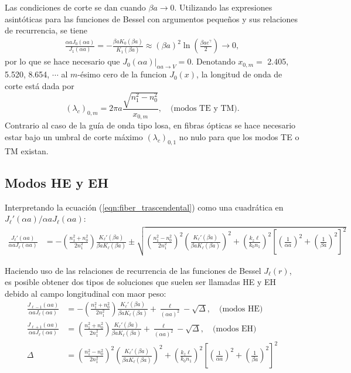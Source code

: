 Las condiciones de corte se dan cuando $\beta a \to 0$. Utilizando las expresiones asintóticas para las funciones de Bessel con argumentos pequeños y sus relaciones de recurrencia, se tiene
\begin{align*}
	\frac{\alpha a J_0(\alpha a)}{J_1(\alpha a)}  = -\frac{\beta a K_{0}(\beta a)} {K_1(\beta a)} \approx (\beta a)^2\ln\left(\frac{\beta a e^\gamma}{2}\right) \to 0,
\end{align*}
por lo que se hace necesario que $\left. J_0(\alpha a)\right|_{\alpha a \to V} = 0$. Denotando $x_{0,m}=$ 2.405,  5.520,  8.654, $\cdots$ al $m$-ésimo cero de la funcion $J_0(x)$, la longitud de onda de corte está dada por 
\begin{equation}
(\lambda_c)_{0,m} = 2\pi a \frac{\sqrt{n_1^2 - n_0^2}}{x_{0,m}}, \quad\text{(modos TE y TM).}
\end{equation} Contrario al caso de la guía de onda tipo losa, en fibras ópticas se hace necesario estar bajo un umbral de corte máximo $(\lambda_c)_{0,1}$ no nulo para que los modos TE o TM existan.


\subsection{Modos HE y EH}
Interpretando la ecuación (\ref{eqn:fiber_trascendental}) como una cuadrática en $J_\ell'(\alpha a)/\alpha a J_\ell(\alpha a)$:
\begin{align*}
	\frac{J_\ell'(\alpha a)}{\alpha a J_\ell(\alpha a)} &= -\left(\frac{n_1^2+n_0^2}{2n_1^2}\right) \frac{K_\ell'(\beta a)}{\beta a K_\ell(\beta a)}\pm\sqrt{\left(\frac{n_1^2-n_0^2}{2n_1^2}\right)^2\left(\frac{K_\ell'(\beta a)}{\beta a K_\ell(\beta a)}\right)^2+ \left( \frac{ k_z \ell}{ k_0 n_1} \right)^2\left[ \left(\frac{1}{\alpha a}\right)^2 + \left(\frac{1}{\beta a}\right)^2 \right]^2 }
\end{align*}

Haciendo uso de las relaciones de recurrencia de las funciones de Bessel $J_\ell(r)$,  es posible obtener dos tipos de soluciones que suelen ser llamadas HE y EH debido al campo longitudinal con maor peso:
\begin{align}
		\frac{J_{\ell-1}(\alpha a)}{\alpha a J_\ell(\alpha a)} &= -\left(\frac{n_1^2+n_0^2}{2n_1^2}\right) \frac{K_\ell'(\beta a)}{\beta a K_\ell(\beta a)}+\frac{\ell}{(\alpha a)^2}-\sqrt{\Delta}, \quad \text{(modos HE)}
		\label{eqn:HE}
	\\
		\frac{J_{\ell+1}(\alpha a)}{\alpha a J_\ell(\alpha a)} &= \left(\frac{n_1^2+n_0^2}{2n_1^2}\right) \frac{K_\ell'(\beta a)}{\beta a K_\ell(\beta a)}+\frac{\ell}{(\alpha a)^2}-\sqrt{\Delta}, \quad \text{(modos EH)}
		\label{eqn:EH}
		\\
		\Delta &= \left(\frac{n_1^2-n_0^2}{2n_1^2}\right)^2\left(\frac{K_\ell'(\beta a)}{\beta a K_\ell(\beta a)}\right)^2+ \left( \frac{ k_z \ell}{ k_0 n_1} \right)^2\left[ \left(\frac{1}{\alpha a}\right)^2 + \left(\frac{1}{\beta a}\right)^2 \right]^2 \nonumber
\end{align}

